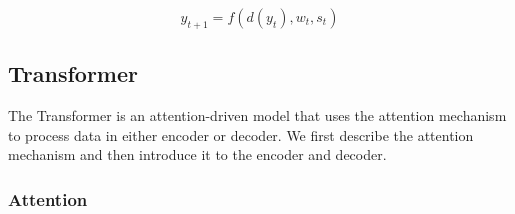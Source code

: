 \begin{equation}
    \hat{y}_{t+1} = f(d(y_t), w_t, s_t) \label{eq:eq10}
\end{equation}

\subsection{Transformer} \label{sec:transformer}

The Transformer is an attention-driven model that uses the attention mechanism to process data in either encoder or decoder. We first describe the attention mechanism and then introduce it to the encoder and decoder.

\subsubsection{Attention}

